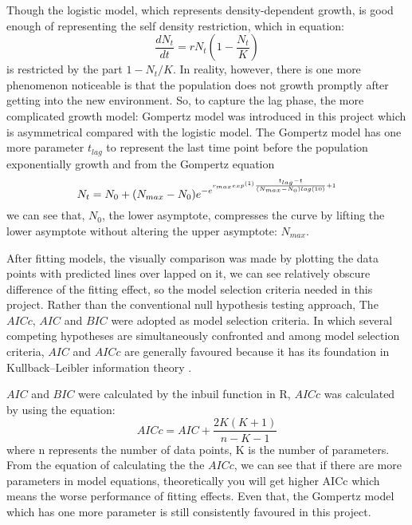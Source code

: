 \documentclass[11pt, a4paper]{article}
\begin{document}
Though the logistic model, which represents density-dependent growth\citep{eberhardt2008analyzing}, is good enough of representing the self density restriction, which in equation: \begin{equation} \label{eqn:Logistci}
    \frac{dN_t}{dt}= rN_t(1-\frac{N_t}{K})
\end{equation} is restricted by the part $1-N_t/K$. In reality, however, there is one more phenomenon noticeable is that the population does not growth promptly after getting into the new environment. So, to capture the lag phase, the more complicated growth model: Gompertz model was introduced in this project which is asymmetrical compared with the logistic model. The Gompertz model has one more parameter $t_{lag}$ to represent the last time point before the population exponentially growth and from the Gompertz equation \begin{equation} \label{eqn:GompEqn}
    N_t= N_0 + (N_{max} - N_0) e^{-e^{r_{max} exp^{(1)}  {\frac{t_{lag}-t}{(N_{max}-N_0)log(10)}\\} +1}}
\end{equation} we can see that, $N_0$, the lower asymptote, compresses the curve by lifting the lower asymptote without altering the upper asymptote: $N_{max}$.\citep{tjorve2017use}

After fitting models, the visually comparison was made by plotting the data points with predicted lines over lapped on it, we can see relatively obscure difference of the fitting effect, so the model selection criteria needed in this project. Rather than the conventional null hypothesis testing approach, The $AICc$, $AIC$ and $BIC$\citep{johnson2004model} were adopted as model selection criteria. In which several competing hypotheses are simultaneously confronted and among model selection criteria, $AIC$ and $AICc$ are generally favoured because it has its foundation in Kullback–Leibler information theory \citep{anderson2004model}. 

$AIC$ and $BIC$ were calculated by the inbuil function in R, $AICc$ was calculated by using the equation: \begin{equation}\label{eqn:AICc}
    AICc = AIC + \frac{2K(K+1)}{n−K−1}
\end{equation} where n represents the number of data points, K is the number of parameters. From the equation of calculating the the $AICc$, we can see that if there are more parameters in model equations, theoretically you will get higher AICc which means the worse performance of fitting effects. Even that, the Gompertz model which has one more parameter is still consistently favoured in this project.
\end{document}
